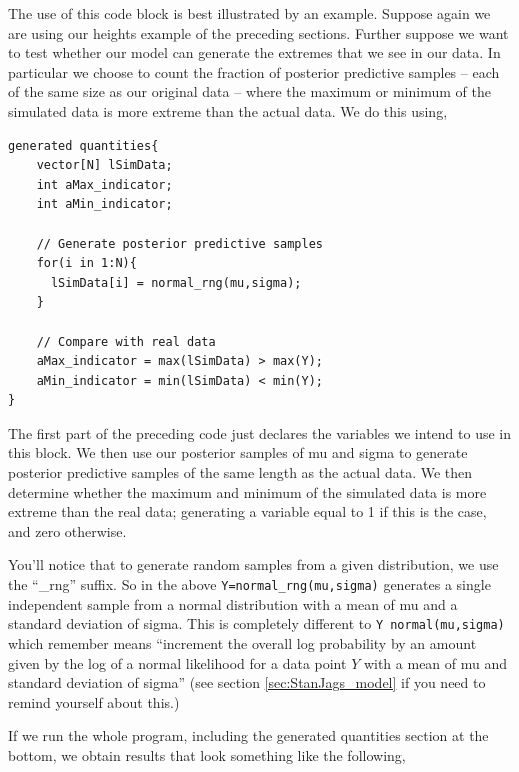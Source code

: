 \documentclass[11pt,fullpage]{book}
\begin{document}
The use of this code block is best illustrated by an example. Suppose again we are using our heights example of the preceding sections. Further suppose we want to test whether our model can generate the extremes that we see in our data. In particular we choose to count the fraction of posterior predictive samples -- each of the same size as our original data -- where the maximum or minimum of the simulated data is more extreme than the actual data. We do this using,

\begin{verbatim}
generated quantities{
    vector[N] lSimData;
    int aMax_indicator;
    int aMin_indicator;
      
    // Generate posterior predictive samples
    for(i in 1:N){
      lSimData[i] = normal_rng(mu,sigma);
    }
     
    // Compare with real data 
    aMax_indicator = max(lSimData) > max(Y);
    aMin_indicator = min(lSimData) < min(Y);
}
\end{verbatim}

The first part of the preceding code just declares the variables we intend to use in this block. We then use our posterior samples of mu and sigma to generate posterior predictive samples of the same length as the actual data. We then determine whether the maximum and minimum of the simulated data is more extreme than the real data; generating a variable equal to 1 if this is the case, and zero otherwise.

You'll notice that to generate random samples from a given distribution, we use the ``\_rng'' suffix. So in the above \texttt{Y=normal_rng(mu,sigma)} generates a single independent sample from a normal distribution with a mean of mu and a standard deviation of sigma. This is completely different to \texttt{Y~normal(mu,sigma)} which remember means ``increment the overall log probability by an amount given by the log of a normal likelihood for a data point $Y$ with a mean of mu and standard deviation of sigma'' (see section \ref{sec:StanJags_model} if you need to remind yourself about this.) 

If we run the whole program, including the generated quantities section at the bottom, we obtain results that look something like the following,
\end{document}

